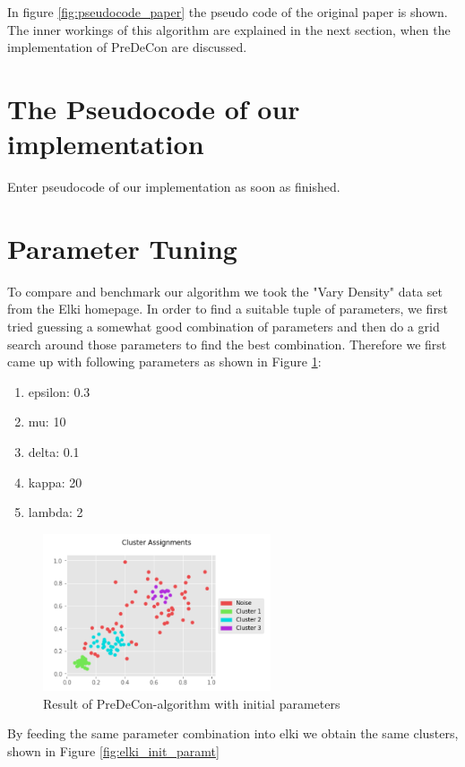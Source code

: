 \documentclass[a4paper]{article}
\begin{document}
In figure \ref{fig:pseudocode_paper} the pseudo code of the original paper is shown. The inner workings of this algorithm are explained in the next section, when the implementation of PreDeCon are discussed.



\section{The Pseudocode of our implementation}
Enter pseudocode of our implementation as soon as finished.
\section{Parameter Tuning}
To compare and benchmark our algorithm we took the "Vary Density" data set from the Elki homepage.
In order to find a suitable tuple of parameters, we first tried guessing a somewhat good combination of parameters and then do a grid search around those parameters to find the best combination. Therefore we first came up with following parameters as shown in Figure \ref{fig:init_paramt}:
\begin{enumerate}
\item epsilon: 0.3
\item mu: 10
\item delta: 0.1
\item kappa: 20
\item lambda: 2
\end{enumerate}

\begin{figure}
	\centering
	\includegraphics[width=0.6\textwidth]{init_paramt.png}
	\caption{Result of PreDeCon-algorithm with initial parameters}
    \label{fig:init_paramt}
\end{figure}

By feeding the same parameter combination into elki we obtain the same clusters, shown in Figure \ref{fig:elki_init_paramt}
\end{document}
